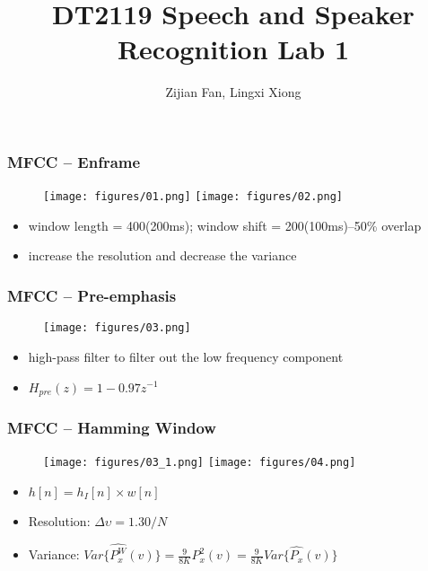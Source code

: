 \documentclass[t]{beamer}
\title
	{%
	  DT2119 Speech and Speaker Recognition Lab 1
	}
\author[Zifan, Lingxi]
	{
	Zijian Fan, Lingxi Xiong
	}
\institute{}
\date{}
\begin{document}
	
\begin{frame}
	\titlepage
\end{frame}
	
\begin{frame}
	\frametitle{MFCC -- Enframe}
	\begin{figure}
\centering
		\texttt{[image: figures/01.png]}
		\texttt{[image: figures/02.png]}
	\end{figure}
			
	\begin{itemize}
		\item window length = 400(200ms); window shift = 200(100ms)--50\% overlap
		\item increase the resolution and decrease the variance
	\end{itemize}
\end{frame}
	
\begin{frame}
	\frametitle{MFCC -- Pre-emphasis}
	\begin{figure}
		\texttt{[image: figures/03.png]}
	\end{figure}
			  
	\begin{itemize}
		\item high-pass filter to filter out the low frequency component
		\item $H_{pre}\left( z \right) =1-0.97z^{-1}$
	\end{itemize}
\end{frame}
	
\begin{frame}
	\frametitle{MFCC -- Hamming Window}
	\begin{figure}
\centering
		\texttt{[image: figures/03\_1.png]}
		\texttt{[image: figures/04.png]}
	\end{figure}

	\begin{itemize}
		\item $h\left[ n \right] =h_I\left[ n \right] \times w\left[ n \right] $
		\item Resolution: $\Delta \upsilon =\text{1.30/}N$
\\
		\item Variance: $Var\{ \widehat{P_{x}^{W}}(v) \} =\frac{9}{8K}P_{x}^2(v) = \frac{9}{8K}Var \{ \widehat{P_x}\left( v \right)\} $

	\end{itemize}

	
\end{frame}
	
\end{document}
